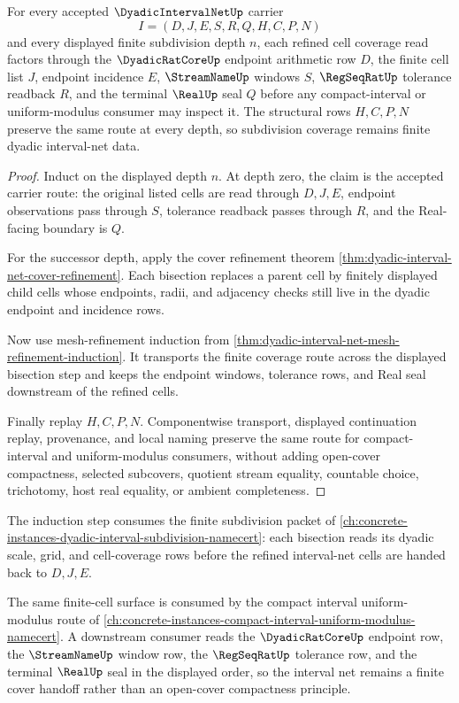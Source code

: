 \begin{theorem}
\label{thm:dyadic-interval-net-subdivision-depth-coverage}
For every accepted $\DyadicIntervalNetUp$ carrier
$$
I=(D,J,E,S,R,Q,H,C,P,N)
$$
and every displayed finite subdivision depth $n$, each refined cell coverage read factors through the $\DyadicRatCoreUp$ endpoint arithmetic row $D$, the finite cell list $J$, endpoint incidence $E$, $\StreamNameUp$ windows $S$, $\RegSeqRatUp$ tolerance readback $R$, and the terminal $\RealUp$ seal $Q$ before any compact-interval or uniform-modulus consumer may inspect it. The structural rows $H,C,P,N$ preserve the same route at every depth, so subdivision coverage remains finite dyadic interval-net data.
\end{theorem}
\begin{proof}
Induct on the displayed depth $n$. At depth zero, the claim is the accepted carrier route: the original listed cells are read through $D,J,E$, endpoint observations pass through $S$, tolerance readback passes through $R$, and the Real-facing boundary is $Q$.

For the successor depth, apply the cover refinement theorem \autoref{thm:dyadic-interval-net-cover-refinement}. Each bisection replaces a parent cell by finitely displayed child cells whose endpoints, radii, and adjacency checks still live in the dyadic endpoint and incidence rows.

Now use mesh-refinement induction from \autoref{thm:dyadic-interval-net-mesh-refinement-induction}. It transports the finite coverage route across the displayed bisection step and keeps the endpoint windows, tolerance rows, and Real seal downstream of the refined cells.

Finally replay $H,C,P,N$. Componentwise transport, displayed continuation replay, provenance, and local naming preserve the same route for compact-interval and uniform-modulus consumers, without adding open-cover compactness, selected subcovers, quotient stream equality, countable choice, trichotomy, host real equality, or ambient completeness.
\end{proof}

The induction step consumes the finite subdivision packet of \autoref{ch:concrete-instances-dyadic-interval-subdivision-namecert}: each bisection reads its dyadic scale, grid, and cell-coverage rows before the refined interval-net cells are handed back to $D,J,E$.

The same finite-cell surface is consumed by the compact interval uniform-modulus route of \autoref{ch:concrete-instances-compact-interval-uniform-modulus-namecert}. A downstream consumer reads the $\DyadicRatCoreUp$ endpoint row, the $\StreamNameUp$ window row, the $\RegSeqRatUp$ tolerance row, and the terminal $\RealUp$ seal in the displayed order, so the interval net remains a finite cover handoff rather than an open-cover compactness principle.

